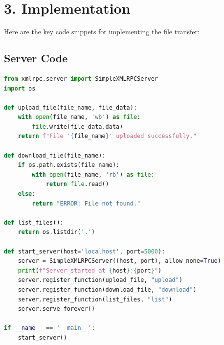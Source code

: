 \documentclass[12pt,a4paper]{article}
\begin{document}
\section*{3. Implementation}
Here are the key code snippets for implementing the file transfer:

\subsection*{Server Code}
\begin{lstlisting}[language=Python, caption=Server Code]
from xmlrpc.server import SimpleXMLRPCServer
import os

def upload_file(file_name, file_data):
    with open(file_name, 'wb') as file:
        file.write(file_data.data)
    return f"File '{file_name}' uploaded successfully."

def download_file(file_name):
    if os.path.exists(file_name):
        with open(file_name, 'rb') as file:
            return file.read()
    else:
        return "ERROR: File not found."

def list_files():
    return os.listdir('.')

def start_server(host='localhost', port=5000):
    server = SimpleXMLRPCServer((host, port), allow_none=True)
    print(f"Server started at {host}:{port}")
    server.register_function(upload_file, "upload")
    server.register_function(download_file, "download")
    server.register_function(list_files, "list")
    server.serve_forever()

if __name__ == '__main__':
    start_server()

\end{lstlisting}
\end{document}
